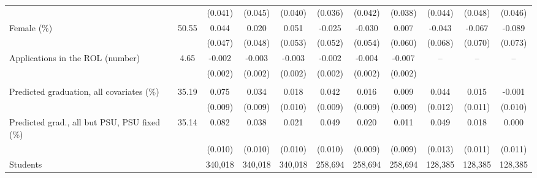 \begin{tabular}{lc*{9}{c}}
 &  & (0.041) & (0.045) & (0.040) & (0.036) & (0.042) & (0.038) & (0.044) & (0.048) & (0.046) \\
Female (\%) &  50.55 &  0.044 &  0.020 &  0.051 & -0.025 & -0.030 &  0.007 & -0.043 & -0.067 & -0.089 \\
 &  & (0.047) & (0.048) & (0.053) & (0.052) & (0.054) & (0.060) & (0.068) & (0.070) & (0.073) \\
Applications in the ROL (number) &   4.65 & -0.002 & -0.003 & -0.003\sym{**} & -0.002 & -0.004\sym{*} & -0.007\sym{***} & -- & -- & -- \\
 &  & (0.002) & (0.002) & (0.002) & (0.002) & (0.002) & (0.002) &  &  &  \\
\addlinespace
\multicolumn{11}{l}{\textit{Joint tests}} \\
Predicted graduation, all covariates (\%) &  35.19 &  0.075\sym{***} &  0.034\sym{***} &  0.018\sym{*} &  0.042\sym{***} &  0.016\sym{*} &  0.009 &  0.044\sym{***} &  0.015 & -0.001 \\
 &  & (0.009) & (0.009) & (0.010) & (0.009) & (0.009) & (0.009) & (0.012) & (0.011) & (0.010) \\
Predicted grad., all but PSU, PSU fixed (\%) &  35.14 &  0.082\sym{***} &  0.038\sym{***} &  0.021\sym{**} &  0.049\sym{***} &  0.020\sym{**} &  0.011 &  0.049\sym{***} &  0.018 &  0.000 \\
 &  & (0.010) & (0.010) & (0.010) & (0.010) & (0.009) & (0.009) & (0.013) & (0.011) & (0.011) \\
\midrule
Students &  &   340,018 &   340,018 &   340,018 &   258,694 &   258,694 &   258,694 &   128,385 &   128,385 &   128,385 \\
\bottomrule
\end{tabular}
